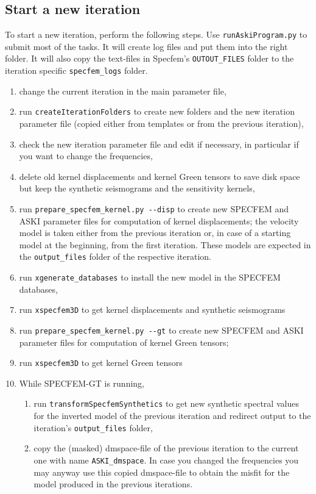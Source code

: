 \subsection{Start a new iteration}
\label{sec:start-new-iteration}
%
To start a new iteration, perform the following steps. Use \verb+runAskiProgram.py+ to submit most of the tasks. It will create log files and put them into the right folder. It will also copy the text-files in Specfem's \verb+OUTOUT_FILES+ folder to the iteration specific \verb+specfem_logs+ folder.
\begin{enumerate}
   \item change the current iteration in the main parameter file,
   \item run \verb+createIterationFolders+ to create new folders and the new iteration parameter file (copied either from templates or from the previous iteration),
   \item check the new iteration parameter file and edit if necessary, in particular if you want to change the frequencies,
   \item delete old kernel displacements and kernel Green tensors to save disk space but keep the synthetic seismograms and the sensitivity kernels,
   \item run \verb+prepare_specfem_kernel.py --disp+ to create new SPECFEM and ASKI parameter files for computation of kernel displacements; the velocity model is taken either from the previous iteration or, in case of a starting model at the beginning, from the first iteration. These models are expected in the \verb+output_files+ folder of the respective iteration.
   \item run \verb+xgenerate_databases+ to install the new model in the SPECFEM databases,
   \item run \verb+xspecfem3D+ to get kernel displacements and synthetic seismograms
   \item run  \verb+prepare_specfem_kernel.py --gt+ to create new SPECFEM and ASKI parameter files for computation of kernel Green tensors;
   \item run \verb+xspecfem3D+ to get kernel Green tensors
   \item While SPECFEM-GT is running,
   \begin{enumerate}
      \item run \verb+transformSpecfemSynthetics+ to get new synthetic spectral values for the inverted model of the previous iteration and redirect output to the iteration's \verb+output_files+ folder,
      \item  copy the (masked) dmspace-file of the previous iteration to the current one with name \verb+ASKI_dmspace+. In case you changed the frequencies you may anyway use this copied dmspace-file to obtain the misfit for the model produced in the previous iterations.

\end{enumerate}
\end{enumerate}
